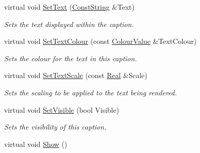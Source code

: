 \begin{DoxyCompactItemize}
virtual void \hyperlink{classMezzanine_1_1UI_1_1Caption_aa47e6ddbe4b6181d4d2e963360866a43}{SetText} (\hyperlink{namespaceMezzanine_a63cd699ac54b73953f35ec9cfc05e506}{ConstString} \&Text)
\begin{DoxyCompactList}\small\item\em Sets the text displayed within the caption. \item\end{DoxyCompactList}\item 
virtual void \hyperlink{classMezzanine_1_1UI_1_1Caption_ad7a376cc999615e1a0b2b47bcf2b95de}{SetTextColour} (const \hyperlink{classMezzanine_1_1ColourValue}{ColourValue} \&TextColour)
\begin{DoxyCompactList}\small\item\em Sets the colour for the text in this caption. \item\end{DoxyCompactList}\item 
virtual void \hyperlink{classMezzanine_1_1UI_1_1Caption_a26b5af3af19440f274a7938806043ca7}{SetTextScale} (const \hyperlink{namespaceMezzanine_a726731b1a7df72bf3583e4a97282c6f6}{Real} \&Scale)
\begin{DoxyCompactList}\small\item\em Sets the scaling to be applied to the text being rendered. \item\end{DoxyCompactList}\item 
virtual void \hyperlink{classMezzanine_1_1UI_1_1Caption_a77ba9fb0b2b8298c19f856b4fb7c8d3d}{SetVisible} (bool Visible)
\begin{DoxyCompactList}\small\item\em Sets the visibility of this caption. \item\end{DoxyCompactList}\item 
\hypertarget{classMezzanine_1_1UI_1_1Caption_a11703635ef146c294c7e04b73f38ea1f}{
virtual void \hyperlink{classMezzanine_1_1UI_1_1Caption_a11703635ef146c294c7e04b73f38ea1f}{Show} ()}
\label{classMezzanine_1_1UI_1_1Caption_a11703635ef146c294c7e04b73f38ea1f}


\end{DoxyCompactItemize}
